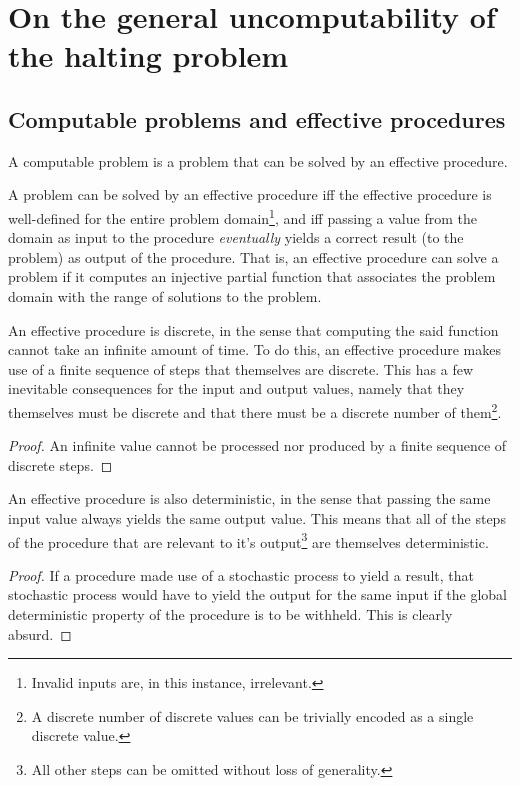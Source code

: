 \chapter{On the general uncomputability of the halting problem}

\section{Computable problems and effective procedures}

A computable problem is a problem that can be solved by an effective procedure.

A problem can be solved by an effective procedure iff the effective procedure
is well-defined for the entire problem domain\footnote{Invalid inputs are, in
this instance, irrelevant.}, and iff passing a value from the domain as input
to the procedure \emph{eventually} yields a correct result (to the problem) as
output of the procedure. That is, an effective procedure can solve a problem if
it computes an injective partial function that associates the problem domain
with the range of solutions to the problem.

An effective procedure is discrete, in the sense that computing the said
function cannot take an infinite amount of time. To do this, an effective
procedure makes use of a finite sequence of steps that themselves are discrete.
This has a few inevitable consequences for the input and output values, namely
that they themselves must be discrete and that there must be a discrete number
of them\footnote{A discrete number of discrete values can be trivially encoded
as a single discrete value.}.

\begin{proof} An infinite value cannot be processed nor produced by a finite
sequence of discrete steps.\end{proof}

An effective procedure is also deterministic, in the sense that passing the
same input value always yields the same output value. This means that all of
the steps of the procedure that are relevant to it's output\footnote{All other
steps can be omitted without loss of generality.} are themselves deterministic.

\begin{proof} If a procedure made use of a stochastic process to yield a
result, that stochastic process would have to yield the output for the same
input if the global deterministic property of the procedure is to be withheld.
This is clearly absurd.\end{proof}

